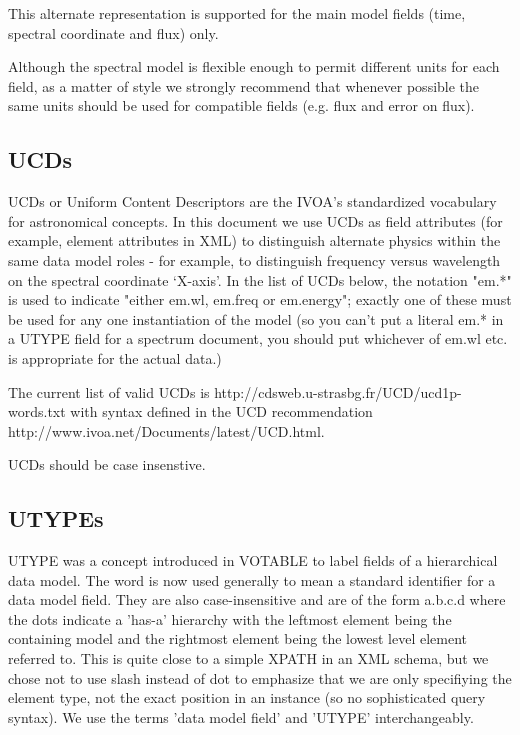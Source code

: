 \documentclass[11pt]{article}
\begin{document}
This alternate representation is supported for the
main model fields (time, spectral coordinate and flux) only.



Although the spectral model is flexible enough to permit different units
for each field, as a matter of style we strongly recommend that whenever
possible the
same units should be used for compatible fields (e.g. flux and error on flux).

\subsection{UCDs}

UCDs or Uniform Content Descriptors are the IVOA's standardized vocabulary
for astronomical concepts. In this document we use UCDs as field attributes
(for example, element attributes in XML) to distinguish alternate 
physics within the same data model roles - for example, to distinguish
frequency versus wavelength on the spectral coordinate `X-axis'.
In the list of UCDs below, the notation "em.*" is used to indicate "either
em.wl, em.freq or em.energy"; exactly one of these must be used for
any one instantiation of the model (so you can't put a literal em.* in
a UTYPE field for a spectrum document, you should put whichever of
em.wl etc. is appropriate for the actual data.)

The current list of valid UCDs is
http://cdsweb.u-strasbg.fr/UCD/ucd1p-words.txt
with syntax defined in the UCD recommendation
http://www.ivoa.net/Documents/latest/UCD.html.

UCDs should be case insenstive.


\subsection{UTYPEs}

UTYPE was a concept introduced in VOTABLE to label fields of a hierarchical
data model. The word is now used generally to mean a standard identifier
for a data model field. They are also case-insensitive and are of the
form a.b.c.d  where the dots indicate a 'has-a' hierarchy
with the leftmost element being the containing model and the rightmost
element being the lowest level element referred to. This is quite close
to a simple XPATH in an XML schema, but we chose not to use slash instead of
dot to emphasize that we are only specifiying the element type, not the
exact position in an instance (so no sophisticated query syntax).
We use the terms 'data model field' and 'UTYPE' interchangeably.
\end{document}
